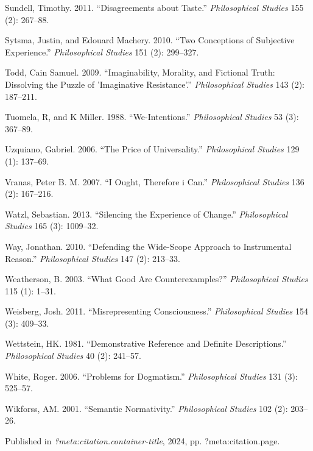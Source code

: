 \documentclass[
  10pt,
  letterpaper,
  DIV=11,
  numbers=noendperiod,
  twoside]{scrartcl}
\newlength{\cslhangindent}
\newenvironment{CSLReferences}[2] %
 {\begin{list}{}{%
  \setlength{\itemindent}{0pt}
  \setlength{\leftmargin}{0pt}
  \setlength{\parsep}{0pt}
  \ifodd #1
   \setlength{\leftmargin}{\cslhangindent}
   \setlength{\itemindent}{-1\cslhangindent}
  \fi
  \setlength{\itemsep}{#2\baselineskip}}}
 {\end{list}}
\begin{document}
\begin{CSLReferences}{1}{0}
Sundell, Timothy. 2011. {``Disagreements about Taste.''}
\emph{Philosophical Studies} 155 (2): 267--88.

Sytsma, Justin, and Edouard Machery. 2010. {``Two Conceptions of
Subjective Experience.''} \emph{Philosophical Studies} 151 (2):
299--327.

Todd, Cain Samuel. 2009. {``Imaginability, Morality, and Fictional
Truth: Dissolving the Puzzle of 'Imaginative Resistance'.''}
\emph{Philosophical Studies} 143 (2): 187--211.

Tuomela, R, and K Miller. 1988. {``We-Intentions.''} \emph{Philosophical
Studies} 53 (3): 367--89.

Uzquiano, Gabriel. 2006. {``The Price of Universality.''}
\emph{Philosophical Studies} 129 (1): 137--69.

Vranas, Peter B. M. 2007. {``I Ought, Therefore i Can.''}
\emph{Philosophical Studies} 136 (2): 167--216.

Watzl, Sebastian. 2013. {``Silencing the Experience of Change.''}
\emph{Philosophical Studies} 165 (3): 1009--32.

Way, Jonathan. 2010. {``Defending the Wide-Scope Approach to
Instrumental Reason.''} \emph{Philosophical Studies} 147 (2): 213--33.

Weatherson, B. 2003. {``What Good Are Counterexamples?''}
\emph{Philosophical Studies} 115 (1): 1--31.

Weisberg, Josh. 2011. {``Misrepresenting Consciousness.''}
\emph{Philosophical Studies} 154 (3): 409--33.

Wettstein, HK. 1981. {``Demonstrative Reference and Definite
Descriptions.''} \emph{Philosophical Studies} 40 (2): 241--57.

White, Roger. 2006. {``Problems for Dogmatism.''} \emph{Philosophical
Studies} 131 (3): 525--57.

Wikforss, AM. 2001. {``Semantic Normativity.''} \emph{Philosophical
Studies} 102 (2): 203--26.

\end{CSLReferences}



\noindent Published in\emph{
?meta:citation.container-title}, 2024, pp. ?meta:citation.page.
\end{document}

